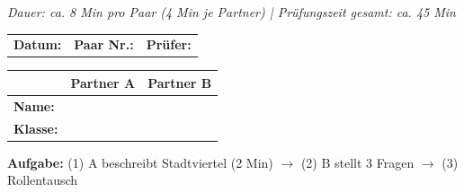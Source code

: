 \documentclass[11pt, a4paper]{article}
\begin{document}

\begin{center}
\end{center}

\vspace{0.2cm}

\begin{center}
\small\textit{Dauer: ca. 8 Min pro Paar (4 Min je Partner) | Prüfungszeit gesamt: ca. 45 Min}
\end{center}

\vspace{0.2cm}

\begin{tabular}{@{}p{6cm}p{5cm}p{5cm}@{}}
\textbf{Datum:} \dotfill & \textbf{Paar Nr.:} \dotfill & \textbf{Prüfer:} \dotfill \\
\end{tabular}

\vspace{0.3cm}

\begin{tabular}{|p{3cm}|p{5.5cm}|p{2cm}|p{5.5cm}|p{2cm}|}
\hline
\rowcolor{gruppeA!20}
& \multicolumn{2}{c|}{\textbf{Partner A}} & \multicolumn{2}{c|}{\textbf{Partner B}} \\
\hline
\textbf{Name:} & \multicolumn{2}{l|}{\dotfill} & \multicolumn{2}{l|}{\dotfill} \\
\hline
\textbf{Klasse:} & \multicolumn{2}{l|}{\dotfill} & \multicolumn{2}{l|}{\dotfill} \\
\hline
\end{tabular}

\vspace{0.3cm}

\textbf{Aufgabe:} (1) A beschreibt Stadtviertel (2 Min) $\rightarrow$ (2) B stellt 3 Fragen $\rightarrow$ (3) Rollentausch

\vspace{0.3cm}
\end{document}
